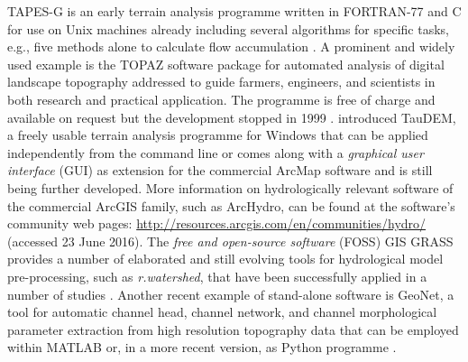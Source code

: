 TAPES-G is an early terrain analysis programme written in FORTRAN-77 and C for use on Unix machines already including several algorithms for specific tasks, e.g., five methods alone to calculate flow accumulation \citep{Gallant1996}.
A prominent and widely used example is the TOPAZ software package for automated analysis of digital landscape topography addressed to guide farmers, engineers, and scientists in both research and practical application.
The programme is free of charge and available on request but the development stopped in 1999 \citep{Garbrecht1999}.
\citet{Tarboton2003} introduced TauDEM, a freely usable terrain analysis programme for Windows that can be applied independently from the command line or comes along with a \emph{graphical user interface} (GUI) as extension for the commercial ArcMap software and is still being further developed.
More information on hydrologically relevant software of the commercial ArcGIS family, such as ArcHydro, can be found at the software's community web pages: \url{http://resources.arcgis.com/en/communities/hydro/} (accessed 23 June 2016).
The \emph{free and open-source software} (FOSS) GIS GRASS provides a number of elaborated and still evolving tools for hydrological model pre-processing, such as \emph{r.watershed}, that have been successfully applied in a number of studies \citep[e.g.,][]{Kinner2005, Metz2011, Neteler2012}.
Another recent example of stand-alone software is GeoNet, a tool for automatic channel head, channel network, and channel morphological parameter extraction from high resolution topography data that can be employed within MATLAB or, in a more recent version, as Python programme \citep{Passalacqua2010, Sangireddy2016}.


